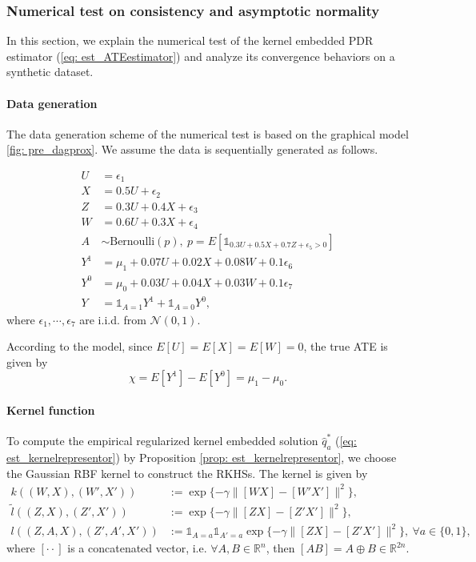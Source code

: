 \subsubsection{Numerical test on consistency and asymptotic normality}

In this section, we explain the numerical test of the kernel embedded PDR estimator (\ref{eq: est_ATEestimator}) and 
analyze its convergence behaviors on a synthetic dataset.

\paragraph{Data generation}

The data generation scheme of the numerical test is based on the graphical model \ref{fig: pre_dagprox}. 
We assume the data is sequentially generated as follows. 

\begin{align*}
    U &= \epsilon_1 \\
    X &= 0.5U + \epsilon_2 \\
    Z &= 0.3U + 0.4X + \epsilon_3 \\
    W &= 0.6U + 0.3X + \epsilon_4 \\
    A &\sim \text{Bernoulli}(p),\ p=E[\mathds{1}_{0.3U + 0.5X + 0.7Z+\epsilon_5 >0}] \\
    Y^1 &= \mu_1 + 0.07U + 0.02X + 0.08W + 0.1\epsilon_6 \\
    Y^0 &= \mu_0 + 0.03U + 0.04X + 0.03W + 0.1\epsilon_7 \\
    Y &= \mathds{1}_{A=1}Y^1 + \mathds{1}_{A=0}Y^0, 
\end{align*}
where $\epsilon_1,\cdots,\epsilon_7$ are i.i.d. from $\mathcal{N}(0,1)$. 

According to the model, since $E[U]=E[X]=E[W]=0$, the true ATE is given by 
\begin{equation*}
    \chi = E[Y^1]-E[Y^0] = \mu_1-\mu_0.
\end{equation*}

\paragraph{Kernel function}

To compute the empirical regularized kernel embedded solution $\widehat{q}_a^*$ (\ref{eq: est_kernelrepresentor}) by Proposition \ref{prop: est_kernelrepresentor}, 
we choose the Gaussian RBF kernel to construct the RKHSs. The kernel is given by 
\begin{align*}
    k((W,X),(W',X')) &:= \exp\{-\gamma\|[W X]-[W' X']\|^2\}, \\
    \tilde{l}((Z,X),(Z',X')) &:= \exp\{-\gamma\|[Z X]-[Z' X']\|^2\}, \\
    l((Z,A,X),(Z',A',X')) &:= \mathds{1}_{A=a}\mathds{1}_{A'=a}\exp\{-\gamma\|[Z X]-[Z' X']\|^2\},\ \forall a\in\{0,1\}, 
\end{align*}
where $[\cdot \cdot]$ is a concatenated vector, i.e. $ \forall A,B\in\mathbb{R}^{n}$, then $[A B]=A\oplus B\in\mathbb{R}^{2n}$. 

